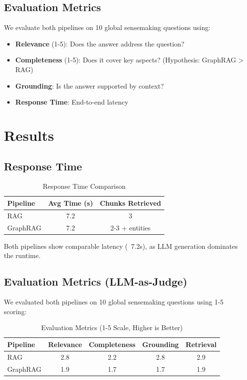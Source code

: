 \documentclass[conference]{IEEEtran}
\begin{document}
\subsection{Evaluation Metrics}
We evaluate both pipelines on 10 global sensemaking questions using:
\begin{itemize}
\item \textbf{Relevance} (1-5): Does the answer address the question?
\item \textbf{Completeness} (1-5): Does it cover key aspects? (Hypothesis: GraphRAG > RAG)
\item \textbf{Grounding}: Is the answer supported by context?
\item \textbf{Response Time}: End-to-end latency
\end{itemize}

\section{Results}
\subsection{Response Time}
\begin{table}[htbp]
\caption{Response Time Comparison}
\label{tab:time}
\centering
\begin{tabular}{|l|c|c|}
\hline
\textbf{Pipeline} & \textbf{Avg Time (s)} & \textbf{Chunks Retrieved} \\
\hline
RAG & 7.2 & 3 \\
\hline
GraphRAG & 7.2 & 2-3 + entities \\
\hline
\end{tabular}
\end{table}

Both pipelines show comparable latency (~7.2s), as LLM generation dominates the runtime.

\subsection{Evaluation Metrics (LLM-as-Judge)}
We evaluated both pipelines on 10 global sensemaking questions using 1-5 scoring:

\begin{table}[htbp]
\caption{Evaluation Metrics (1-5 Scale, Higher is Better)}
\label{tab:metrics}
\centering
\footnotesize
\begin{tabular}{|l|c|c|c|c|}
\hline
\textbf{Pipeline} & \textbf{Relevance} & \textbf{Completeness} & \textbf{Grounding} & \textbf{Retrieval} \\
\hline
RAG & 2.8 & 2.2 & 2.8 & 2.9 \\
\hline
GraphRAG & 1.9 & 1.7 & 1.7 & 1.9 \\
\hline
\end{tabular}
\end{table}
\end{document}
